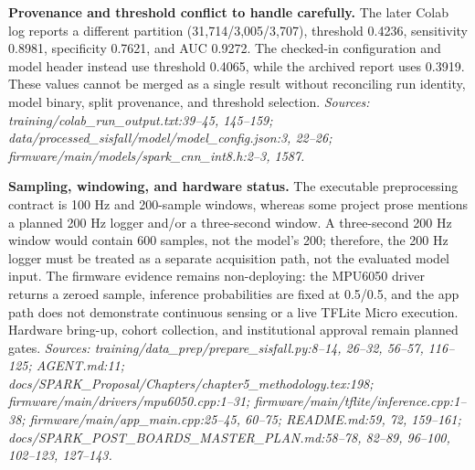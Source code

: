 \noindent\textbf{Provenance and threshold conflict to handle carefully.}
The later Colab log reports a different partition (31,714/3,005/3,707), threshold 0.4236, sensitivity 0.8981, specificity 0.7621, and AUC 0.9272. The checked-in configuration and model header instead use threshold 0.4065, while the archived report uses 0.3919. These values cannot be merged as a single result without reconciling run identity, model binary, split provenance, and threshold selection. \textit{Sources: training/colab\_run\_output.txt:39--45, 145--159; data/processed\_sisfall/model/model\_config.json:3, 22--26; firmware/main/models/spark\_cnn\_int8.h:2--3, 1587.}

\noindent\textbf{Sampling, windowing, and hardware status.}
The executable preprocessing contract is 100 Hz and 200-sample windows, whereas some project prose mentions a planned 200 Hz logger and/or a three-second window. A three-second 200 Hz window would contain 600 samples, not the model's 200; therefore, the 200 Hz logger must be treated as a separate acquisition path, not the evaluated model input. The firmware evidence remains non-deploying: the MPU6050 driver returns a zeroed sample, inference probabilities are fixed at 0.5/0.5, and the app path does not demonstrate continuous sensing or a live TFLite Micro execution. Hardware bring-up, cohort collection, and institutional approval remain planned gates. \textit{Sources: training/data\_prep/prepare\_sisfall.py:8--14, 26--32, 56--57, 116--125; AGENT.md:11; docs/SPARK\_Proposal/Chapters/chapter5\_methodology.tex:198; firmware/main/drivers/mpu6050.cpp:1--31; firmware/main/tflite/inference.cpp:1--38; firmware/main/app\_main.cpp:25--45, 60--75; README.md:59, 72, 159--161; docs/SPARK\_POST\_BOARDS\_MASTER\_PLAN.md:58--78, 82--89, 96--100, 102--123, 127--143.}

